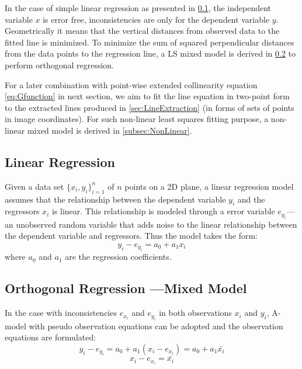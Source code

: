 In the case of simple linear regression as presented in \cref{subsec:LinearRegression}, the independent variable $x$ is error free, inconsistencies are only for the dependent variable $y$. Geometrically it means that the vertical distances from observed data to the fitted line is minimized. To minimize the sum of squared perpendicular distances from the data points to the regression line, a LS mixed model is derived in \cref{subsec:MixedModel} to perform orthogonal regression.

For a later combination with point-wise extended collinearity equation \eqref{eq:Gfunction} in next section, we aim to fit the line equation in two-point form to the extracted lines produced in \cref{sec:LineExtraction} (in forms of sets of points in image coordinates). For such non-linear least squares fitting purpose, a non-linear mixed model is derived in \cref{subsec:NonLinear}. 


\subsection{Linear Regression}
\label{subsec:LinearRegression}

Given a data set $\{x_i,y_i\}^n_{i=1}$ of $n$ points on a 2D plane, a linear regression model assumes that the relationship between the dependent variable $y_i$ and the regressors $x_i$ is linear. This relationship is modeled through a error variable $e_{y_i}$--- an unobserved random variable that adds noise to the linear relationship between the dependent variable and regressors.
Thus the model takes the form:
\begin{equation} \label{eq:SimpleLinearRegression}
y_i - e_{y_i} = a_0 + a_1x_i
\end{equation}
where $a_0$ and $a_1$ are the regression coefficients.


\subsection{Orthogonal Regression ---Mixed Model}
\label{subsec:MixedModel}

In the case with inconsistencies $e_{x_i}$ and $e_{y_i}$ in both observations $x_i$ and $y_i$, A-model with pseudo observation equations can be adopted and the observation equations are formulated:
\begin{equation} \label{eq:MixModel1-1}
y_i - e_{y_i} = a_0 + a_1(x_i-e_{x_i}) = a_0 + a_1\bar{x_i}
\end{equation}
\begin{equation} \label{eq:MixModel1-2}
x_i-e_{x_i} = \bar{x_i}
\end{equation}

